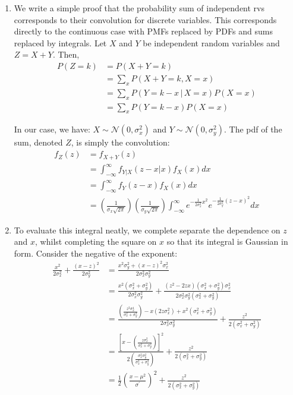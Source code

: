 \documentclass[submit]{harvardml}
\newcommand{\given}{\,|\,}
\newcommand{\N}{\mathcal{N}}
\begin{document}
\begin{enumerate}[label=(\alph*)]
	\item We write a simple proof that the probability sum of independent rvs corresponds to their convolution for discrete variables. This corresponds directly to the continuous case with PMFs replaced by PDFs and sums replaced by integrals. Let $X$ and $Y$ be independent random variables and $Z = X+Y$. Then,
		\begin{align*}
			P(Z = k) &= P(X + Y = k) \\
					&= \sum_{x} P(X + Y = k, X= x) \\
					&= \sum_{x}P(Y=k -x \given X = x) P(X = x)\\
					&= \sum_{x}P(Y= k-x) P(X=x)
		\end{align*}
	
	In our case, we have: $X \sim \N(0, \sigma_{x}^2)$ and $Y \sim \N(0, \sigma_{y}^2)$. The pdf of the sum, denoted $Z$, is simply the convolution:
		\begin{align*}
			f_{Z}(z) &= f_{X+Y}(z) \\
					&= \int_{-\infty}^{\infty} f_{Y|X} (z-x | x) f_{X}(x) dx \\
					&= \int_{-\infty}^{\infty} f_{Y} (z-x)f_{X}(x) dx \\
					&= \left(\frac{1}{\sigma_x\sqrt{2\pi}} \right)\left(\frac{1}{\sigma_y\sqrt{2\pi}} \right) \int_{-\infty}^{\infty} e^{-\frac{1}{2\sigma_x^2}x^2} e^{-\frac{1}{2\sigma_y^2}(z-x)^2} dx
		\end{align*}
	\item To evaluate this integral neatly, we complete separate the dependence on $z$ and $x$, whilst completing the square on $x$ so that its integral is Gaussian in form. Consider the negative of the exponent:
		\begin{align*}
			\frac{x^2}{2\sigma_x^2} + \frac{(x-z)^2}{2\sigma_y^2} &= \frac{x^2\sigma_y^2 + (x-z)^2\sigma_x^2}{2\sigma_x^2\sigma_y^2}\\
&= \frac{x^2(\sigma_x^2 + \sigma_y^2)}{2\sigma_x^2\sigma_y^2} + \frac{(z^2-2zx)(\sigma_x^2 + \sigma_y^2)\sigma_x^2}{2\sigma_x^2\sigma_y^2(\sigma_x^2 + \sigma_y^2)} \\
&= \frac{\left(\frac{z^2\sigma_x^4}{\sigma_x^2 + \sigma_y^2} \right) - x\left(2z\sigma_x^2 \right) + x^2(\sigma_x^2 + \sigma_y^2)}{2\sigma_x^2\sigma_y^2}  + \frac{z^2}{2(\sigma_x^2 + \sigma_y^2)} \\
&=  \frac{\left[x - \left(\frac{z\sigma_x^2}{\sigma_x^2 + \sigma_y^2} \right)\right]^2}{2\left(\frac{\sigma_x^2\sigma_y^2}{\sigma_x^2 + \sigma_y^2} \right)} +      \frac{z^2}{2(\sigma_x^2 + \sigma_y^2)}   \\
&= \frac{1}{2} \left(\frac{x - \mu^2}{\sigma^{'}}\right)^2 +  \frac{z^2}{2(\sigma_x^2 + \sigma_y^2)}
		\end{align*}
		

\end{enumerate}
\end{document}
